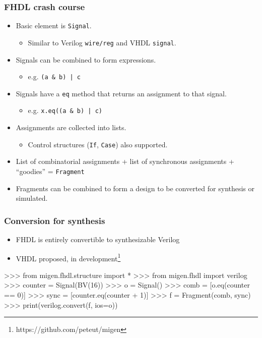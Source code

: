 \documentclass[serif,mathserif]{beamer}
\begin{document}
\begin{frame}[fragile]
\frametitle{FHDL crash course}
\begin{itemize}
\item Basic element is \verb!Signal!.
\begin{itemize}
\item Similar to Verilog \verb!wire/reg! and VHDL \verb!signal!.
\end{itemize}
\item Signals can be combined to form expressions.
\begin{itemize}
\item e.g. \verb!(a & b) | c!
\end{itemize}
\item Signals have a \verb!eq! method that returns an assignment to that signal.
\begin{itemize}
\item e.g. \verb!x.eq((a & b) | c)!
\end{itemize}
\item Assignments are collected into lists.
\begin{itemize}
\item Control structures (\verb!If!, \verb!Case!) also supported.
\end{itemize}
\item List of combinatorial assignments + list of synchronous assignments + ``goodies'' = \verb!Fragment!
\item Fragments can be combined to form a design to be converted for synthesis or simulated.
\end{itemize}
\end{frame}

\begin{frame}[fragile]
\frametitle{Conversion for synthesis}
\begin{itemize}
\item FHDL is entirely convertible to synthesizable Verilog 
\item VHDL proposed, in development\footnote{https://github.com/peteut/migen}
\end{itemize}
\begin{verbatimtab}
>>> from migen.fhdl.structure import *
>>> from migen.fhdl import verilog
>>> counter = Signal(BV(16))
>>> o = Signal()
>>> comb = [o.eq(counter == 0)]
>>> sync = [counter.eq(counter + 1)]
>>> f = Fragment(comb, sync)
>>> print(verilog.convert(f, ios={o}))
\end{verbatimtab}
\end{frame}
\end{document}
